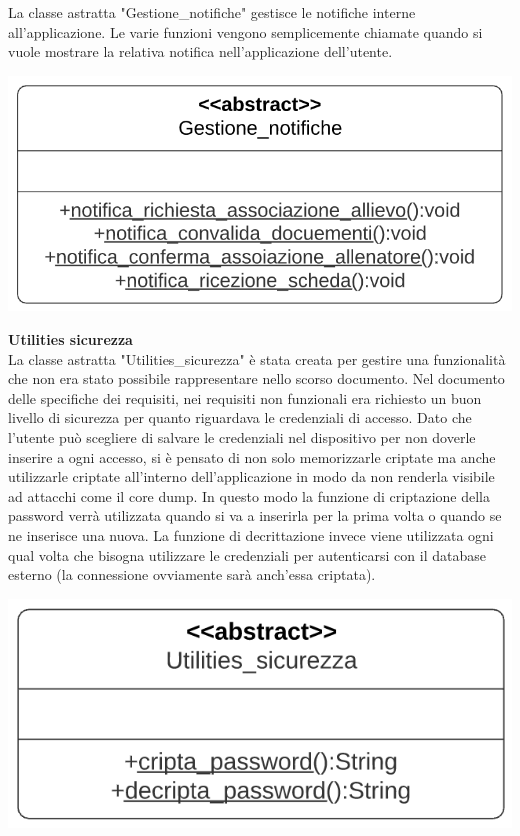 \documentclass{article}
\begin{document}
      La classe astratta "Gestione\_notifiche" gestisce le notifiche interne all’applicazione. Le varie funzioni vengono semplicemente chiamate
      quando si vuole mostrare la relativa notifica nell’applicazione dell’utente.\\
      \begin{center}
            \includegraphics[scale=0.5]{classi/Gestione_notifiche.png}
      \end{center}

      {\large\textbf{Utilities sicurezza}}\\

      La classe astratta "Utilities\_sicurezza" è stata creata per gestire una funzionalità che non era stato possibile rappresentare nello scorso
      documento. Nel documento delle specifiche dei requisiti, nei requisiti non funzionali era richiesto un buon livello di sicurezza per quanto
      riguardava le credenziali di accesso. Dato che l’utente può scegliere di salvare le credenziali nel dispositivo per non doverle inserire a
      ogni accesso, si è pensato di non solo memorizzarle criptate ma anche utilizzarle criptate all’interno dell’applicazione in modo da non
      renderla visibile ad attacchi come il core dump. In questo modo la funzione di criptazione della password verrà utilizzata quando si va a
      inserirla per la prima volta o quando se ne inserisce una nuova. La funzione di decrittazione invece viene utilizzata ogni qual volta che
      bisogna utilizzare le credenziali per autenticarsi con il database esterno (la connessione ovviamente sarà anch’essa criptata).\\
      \begin{center}
            \includegraphics[scale=0.5]{classi/Utilities_sicurezza.png}
      \end{center}
\end{document}
